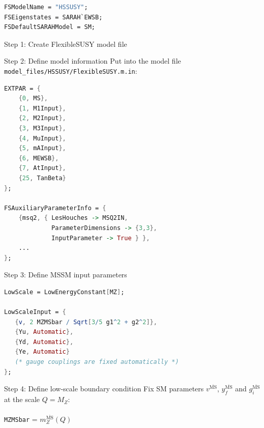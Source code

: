 \documentclass[hyperref={pdfpagelabels=false},ngerman]{beamer}
\newcommand{\MSbar}{\ensuremath{\overline{\text{MS}}}}
\begin{document}
\begin{lrbox}{\listboxt}\begin{lstlisting}[language=Mathematica]
FSModelName = "HSSUSY";
FSEigenstates = SARAH`EWSB;
FSDefaultSARAHModel = SM;
\end{lstlisting}\end{lrbox}

\begin{frame}{Step 1: Create FlexibleSUSY model file}
  \usebox{\listbox}
\end{frame}

\begin{frame}{Step 2: Define model information}
  Put into the model file
  \lstinline{model_files/HSSUSY/FlexibleSUSY.m.in}:
  \\[2em]
  \usebox{\listboxt}
\end{frame}

\begin{lrbox}{\listbox}\begin{lstlisting}[language=Mathematica]
EXTPAR = {
    {0, MS},
    {1, M1Input},
    {2, M2Input},
    {3, M3Input},
    {4, MuInput},
    {5, mAInput},
    {6, MEWSB},
    {7, AtInput},
    {25, TanBeta}
};

FSAuxiliaryParameterInfo = {
    {msq2, { LesHouches -> MSQ2IN,
             ParameterDimensions -> {3,3},
             InputParameter -> True } },
    ...
};
\end{lstlisting}\end{lrbox}

\begin{frame}{Step 3: Define MSSM input parameters}
  \usebox{\listbox}
\end{frame}

\begin{lrbox}{\listbox}\begin{lstlisting}[language=Mathematica]
LowScale = LowEnergyConstant[MZ];

LowScaleInput = {
   {v, 2 MZMSbar / Sqrt[3/5 g1^2 + g2^2]},
   {Yu, Automatic},
   {Yd, Automatic},
   {Ye, Automatic}
   (* gauge couplings are fixed automatically *)
};
\end{lstlisting}\end{lrbox}

\begin{frame}{Step 4: Define low-scale boundary condition}
  Fix SM parameters $v^{\MSbar}$, $y_f^{\MSbar}$ and $g_i^{\MSbar}$ at the scale $Q = M_Z$:\\[2em]
  \usebox{\listbox}
  \\[1em]
  \lstinline{MZMSbar} = $m_Z^{\MSbar}(Q)$
\end{frame}
\end{document}
